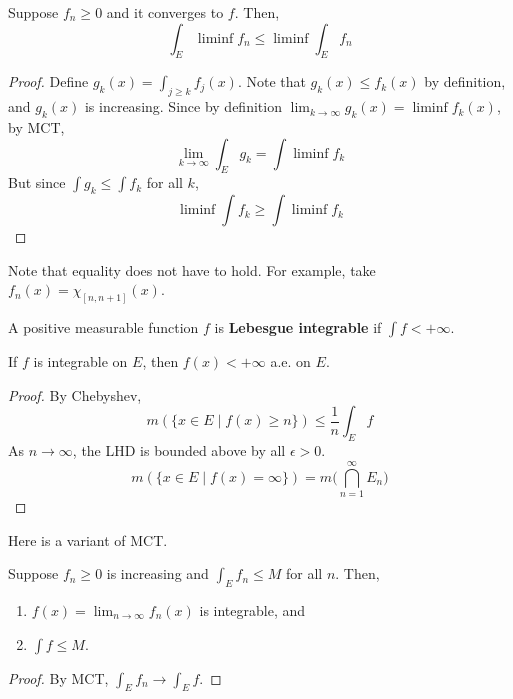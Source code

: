   \begin{lemma}
    Suppose $f_n \geq 0$ and it converges to $f$. Then, 
    \begin{equation}
      \int_E \liminf{f_n} \leq \liminf \int_E f_n
    \end{equation}
  \end{lemma}
  \begin{proof}
    Define $g_k (x) = \int_{j \geq k} f_j (x)$. Note that $g_k (x) \leq f_k (x)$ by definition, and $g_k (x)$ is increasing. Since by definition $\lim_{k \to \infty} g_k (x) = \liminf f_k (x)$, by MCT, 
    \begin{equation}
      \lim_{k \to \infty} \int_E g_k = \int \liminf f_k 
    \end{equation}
    But since $\int g_k \leq \int f_k$ for all $k$, 
    \begin{equation}
      \liminf \int f_k \geq \int \liminf f_k 
    \end{equation}
  \end{proof}

  Note that equality does not have to hold. For example, take $f_n (x) = \chi_{[n, n+1]} (x)$. 

  \begin{definition}
    A positive measurable function $f$ is \textbf{Lebesgue integrable} if $\int f < +\infty$. 
  \end{definition}

  \begin{theorem}[]
    If $f$ is integrable on $E$, then $f(x) < +\infty$ a.e. on $E$. 
  \end{theorem}
  \begin{proof}
    By Chebyshev, 
    \begin{equation}
      m( \{x \in E \mid f(x) \geq n \}) \leq \frac{1}{n} \int_E f 
    \end{equation}
    As $n \to \infty$, the LHD is bounded above by all $\epsilon > 0$. 
    \begin{equation}
      m( \{x \in E \mid f(x) = \infty \}) = m \bigg( \bigcap_{n=1}^\infty E_n \bigg)
    \end{equation}
  \end{proof} 

  Here is a variant of MCT. 

  \begin{lemma} 
    Suppose $f_n \geq 0$ is increasing and $\int_E f_n \leq M$ for all $n$. Then, 
    \begin{enumerate}
      \item $f(x) = \lim_{n \to \infty} f_n (x)$ is integrable, and 
      \item $\int f \leq M$. 
    \end{enumerate}
  \end{lemma}
  \begin{proof}
    By MCT, $\int_E f_n \to \int_E f$. 
  \end{proof} 

